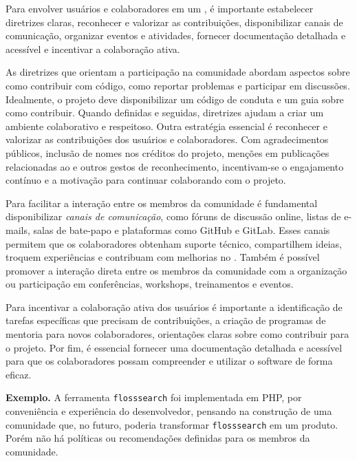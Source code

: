 Para envolver usuários e colaboradores em um \RS, é importante estabelecer diretrizes claras, reconhecer e valorizar as contribuições, disponibilizar canais de comunicação, organizar eventos e atividades, fornecer documentação detalhada e acessível e incentivar a colaboração ativa.

As diretrizes que orientam a participação na comunidade abordam aspectos sobre como contribuir com código, como reportar problemas e participar em discussões. Idealmente, o projeto deve disponibilizar um código de conduta e um guia sobre como contribuir.
Quando definidas e seguidas, diretrizes ajudam a criar um ambiente colaborativo e respeitoso. 
%
Outra estratégia essencial é reconhecer e valorizar as contribuições dos usuários e colaboradores. Com agradecimentos públicos, inclusão de nomes nos créditos do projeto, menções em publicações relacionadas ao \RSw e outros gestos de reconhecimento, incentivam-se o engajamento contínuo e a motivação para continuar colaborando com o projeto.

Para facilitar a interação entre os membros da comunidade é fundamental disponibilizar \textit{canais de comunicação}, como fóruns de discussão online, listas de e-mails, salas de bate-papo e plataformas como GitHub e GitLab. 
Esses canais permitem que os colaboradores obtenham suporte técnico, compartilhem ideias, troquem experiências e contribuam com melhorias no \RS. Também é possível promover a interação direta entre os membros da comunidade com a organização ou participação em conferências, workshops, treinamentos e eventos.

Para incentivar a colaboração ativa dos usuários é importante a identificação de tarefas específicas que precisam de contribuições, a criação de programas de mentoria para novos colaboradores, orientações claras sobre como contribuir para o projeto. 
Por fim, é essencial fornecer uma documentação detalhada e acessível para que os colaboradores possam compreender e utilizar o software de forma eficaz. 



\noindent\textbf{Exemplo.} 
A ferramenta \texttt{flosssearch} foi implementada em PHP, por conveniência e experiência do desenvolvedor, pensando na construção de uma comunidade que, no futuro, poderia transformar \texttt{flosssearch} em um produto.
Porém não há políticas ou recomendações definidas para os membros da comunidade.

